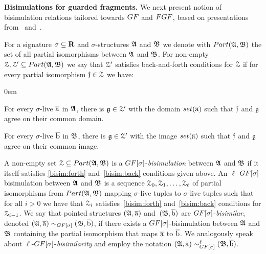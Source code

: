 \noindent \textbf{Bisimulations for guarded fragments.}
%
We next present notion of bisimulation relations tailored towards $\GF$ and $\FGF$, based on presentations from~\cite[Sec. 2.2.3]{Otto04} and~\cite[Sec. 2]{BednarczykJ22}.

For a signature $\sigma \subseteq \mathbf{R}$ and $\sigma$-structures ${\mathfrak{A}}$ and ${\mathfrak{B}}$ we denote with $\PartIso{\str{A}}{\str{B}}$ the set of all partial isomorphisms between ${\mathfrak{A}}$ and ${\mathfrak{B}}$. 
For non-empty $\bisimZ, \bisimZ' \subseteq \PartIso{\str{A}}{\str{B}}$ we say that $\mathcal{Z}'$ satisfies back-and-forth conditions for $\mathcal{Z}$ if for every partial isomorphism $\mathfrak{f} \in \mathcal{Z}$ we have:
%
\begin{description}\itemsep0em
  \item[\desclabel{(Forth)}{bisim:forth}] For every $\sigma$-live $\overline{\mathrm{a}}$ in ${\mathfrak{A}}$, there is $\mathfrak{g} \in \mathcal{Z}'$ with the domain $\set(\elemtuplea)$ such that $\mathfrak{f}$ and $\mathfrak{g}$ agree on their common domain. 
  \item[\desclabel{(Back)}{bisim:back}] For every $\sigma$-live $\overline{\mathrm{b}}$ in ${\mathfrak{B}}$, there is $\mathfrak{g} \in \mathcal{Z}'$ with the image $\set(\elemtuplea)$ such that $\mathfrak{f}$ and $\mathfrak{g}$ agree on their common image.
\end{description}
A non-empty set $\bisimZ \subseteq \PartIso{\str{A}}{\str{B}}$ is a $\GF[\sigma]$-\emph{bisimulation} between ${\mathfrak{A}}$ and ${\mathfrak{B}}$ if it itself satisfies \ref{bisim:forth} and~\ref{bisim:back} conditions given above. 
An $\ell$-$\GF[\sigma]$-bisimulation between ${\mathfrak{A}}$ and ${\mathfrak{B}}$ is a sequence $\mathcal{Z}_0, \mathcal{Z}_1, \ldots, \mathcal{Z}_\ell$ of partial isomorphisms from $\PartIso{\str{A}}{\str{B}}$ mapping $\sigma$-live tuples to $\sigma$-live tuples  such that for all $i > 0$ we have that $\mathcal{Z}_i$ satisfies~\ref{bisim:forth} and~\ref{bisim:back} conditions for $\mathcal{Z}_{i{-}1}$.
We say that pointed structures $({\mathfrak{A}}, \overline{\mathrm{a}})$ and~$({\mathfrak{B}}, \overline{\mathrm{b}})$ are $\GF[\sigma]$-\emph{bisimilar}, denoted $(\str{A}, \elemtuplea) \bisimto_{\GF[\sigma]} (\str{B}, \elemtupleb)$, if there exists a $\GF[\sigma]$-bisimulation  between ${\mathfrak{A}}$ and ${\mathfrak{B}}$ containing the partial isomorphism that maps $\overline{\mathrm{a}}$ to $\overline{\mathrm{b}}$.
We analogously speak about $\ell$-$\GF[\sigma]$-\emph{bisimilarity} and employ the notation $(\str{A}, \elemtuplea) \bisimto_{\GF[\sigma]}^{\ell} (\str{B}, \elemtupleb)$.


